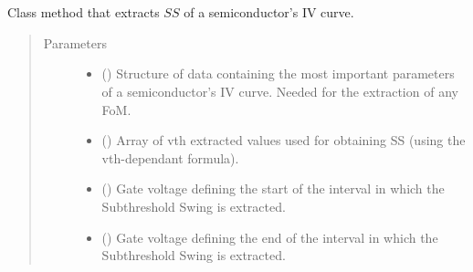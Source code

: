 \documentclass[letterpaper,10pt,english,openany, oneside]{sphinxmanual}
\begin{document}
\begin{fulllineitems}
\label{\detokenize{index:fompy.fom.ss_ext}}~

\begin{fulllineitems}
\label{\detokenize{index:fompy.fom.ss_ext.extraction}}~

\begin{fulllineitems}
Class method that extracts \(SS\) of a semiconductor’s IV curve.

\end{fulllineitems}

\begin{quote}\begin{description}
\item[{Parameters}] \leavevmode\begin{itemize}
\item {} 
 () \textendash{} Structure of data containing the most important parameters of a semiconductor’s IV curve.
Needed for the extraction of any FoM.

\item {} 
 () \textendash{} Array of vth extracted values used for obtaining SS (using the vth-dependant formula).

\item {} 
 () \textendash{} Gate voltage defining the start of the interval in which the Subthreshold Swing is extracted.

\item {} 
 () \textendash{} Gate voltage defining the end of the interval in which the Subthreshold Swing is extracted.

\end{itemize}


\end{description}
\end{quote}
\end{fulllineitems}
\end{fulllineitems}
\end{document}
